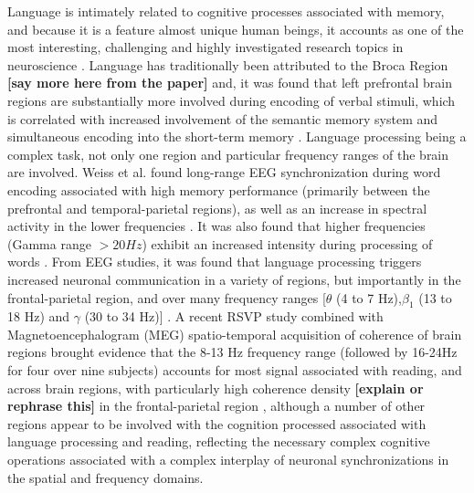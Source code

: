 Language is intimately related to cognitive processes associated with memory, and because it is a feature almost unique human beings, it accounts as one of the most interesting, challenging and highly investigated research topics in neuroscience \cite{beeman1998right,pulvermuller2002neuroscience}. Language has traditionally been attributed to the Broca Region {\bf [say more here from the paper]} \cite{keller2009broca} and, it was found that left prefrontal brain regions are substantially more involved during encoding of verbal stimuli, which is correlated with increased involvement of the semantic memory system and simultaneous encoding into the short-term memory \cite{fletcher1998functiona,tulving1994hemispheric}. Language processing being a complex task, not only one region and particular frequency ranges of the brain are involved. Weiss et al. \cite{weiss2000long} found long-range EEG synchronization during word encoding associated with high memory performance (primarily between the prefrontal and temporal-parietal regions), as well as an increase in spectral activity in the lower frequencies \cite{kujala2007phase}. It was also found that higher frequencies (Gamma range $>20Hz$) exhibit an increased intensity during processing of words \cite{pulvermuller1995spectral}. From EEG studies, it was found that language processing triggers increased neuronal communication in a variety of regions, but importantly in the frontal-parietal region, and over many frequency ranges [$\theta$ (4 to 7 Hz),$\beta_1$ (13 to 18 Hz) and $\gamma$ (30 to 34 Hz)] \cite{weiss2005increased}. A recent RSVP study combined with Magnetoencephalogram (MEG) spatio-temporal acquisition of coherence of brain regions brought evidence that the 8-13 Hz frequency range (followed by 16-24Hz for four over nine subjects) accounts for most signal associated with reading, and across brain regions, with particularly high coherence density {\bf [explain or rephrase this]} in the frontal-parietal region \cite{kujala2007phase}, although a number of other regions appear to be involved with the cognition processed associated with language processing and reading, reflecting the necessary complex cognitive operations associated with a complex interplay of neuronal synchronizations in the spatial and frequency domains.


